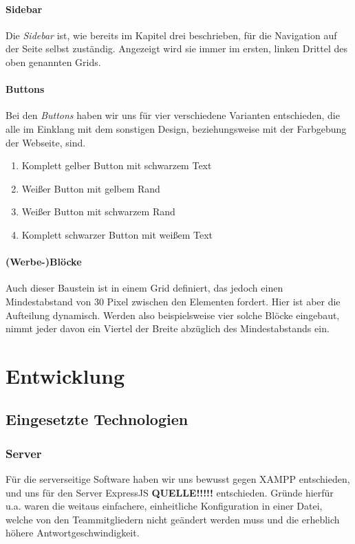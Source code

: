 \documentclass[12pt,a4paper]{article}
\begin{document}
\paragraph{Sidebar}
Die \textit{Sidebar} ist, wie bereits im Kapitel drei beschrieben, für die Navigation auf der Seite selbst zuständig. Angezeigt wird sie immer im ersten, linken Drittel des oben genannten Grids.
\paragraph{Buttons}
Bei den \textit{Buttons} haben wir uns für vier verschiedene Varianten entschieden, die alle im Einklang mit dem sonstigen Design, beziehungsweise mit der Farbgebung der Webseite, sind.
\begin{enumerate}
\item{Komplett gelber Button mit schwarzem Text}
\item{Weißer Button mit gelbem Rand}
\item{Weißer Button mit schwarzem Rand}
\item{Komplett schwarzer Button mit weißem Text}
\end{enumerate}
\paragraph{(Werbe-)Blöcke}
Auch dieser Baustein ist in einem Grid definiert, das jedoch einen Mindestabstand von 30 Pixel zwischen den Elementen fordert. Hier ist aber die Aufteilung dynamisch. Werden also beispielsweise vier solche Blöcke eingebaut, nimmt jeder davon ein Viertel der Breite abzüglich des Mindestabstands ein.
\section{Entwicklung}
\subsection{Eingesetzte Technologien}
\subsubsection{Server}
Für die serverseitige Software haben wir uns bewusst gegen XAMPP entschieden, und uns für den Server ExpressJS \textbf{QUELLE!!!!!}  entschieden. Gründe hierfür u.a. waren die weitaus einfachere, einheitliche Konfiguration in einer Datei, welche von den Teammitgliedern nicht geändert werden muss und die erheblich höhere Antwortgeschwindigkeit.
\end{document}
